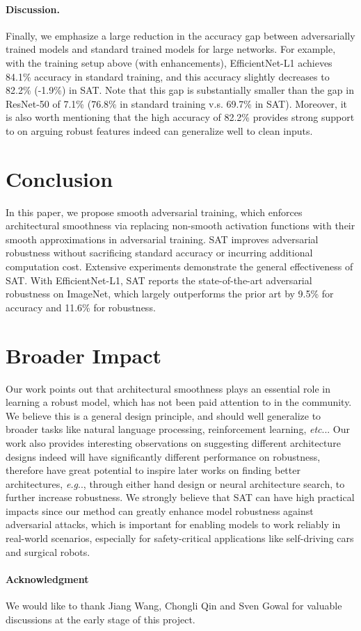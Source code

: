 \documentclass{article}
\makeatletter
\DeclareRobustCommand\onedot{\futurelet\@let@token\@onedot}
\def\@onedot{\ifx\@let@token.\else.\null\fi\xspace}
\def\eg{\emph{e.g}\onedot} \def\Eg{\emph{E.g}\onedot}
\def\etc{\emph{etc}\onedot} \def\vs{\emph{vs}\onedot}
\makeatother
\begin{document}
\paragraph{Discussion.}
Finally, we emphasize a large reduction in the accuracy gap between adversarially trained models and standard trained models for large networks. For example, with the training setup above (with enhancements), EfficientNet-L1 achieves 84.1\% accuracy in standard training, and this accuracy slightly decreases to 82.2\% (-1.9\%) in SAT. Note that this gap is substantially smaller than the gap in ResNet-50 of 7.1\% (76.8\% in standard training v.s. 69.7\% in SAT). Moreover, it is also worth mentioning that the high accuracy of 82.2\% provides strong support to \cite{Ilyas2019} on arguing robust features indeed can generalize well to clean inputs.


\section{Conclusion}
In this paper, we propose smooth adversarial training, which enforces architectural smoothness via replacing non-smooth activation functions with their smooth approximations in adversarial training. SAT improves adversarial robustness without sacrificing standard accuracy or incurring additional computation cost. 
Extensive experiments demonstrate the general effectiveness of SAT. 
With EfficientNet-L1, SAT reports the state-of-the-art adversarial robustness on ImageNet, which largely outperforms the prior art \cite{Qin2019} by 9.5\% for accuracy and 11.6\% for robustness.


\section*{Broader Impact}
Our work points out that architectural smoothness plays an essential role in learning a robust model, which has not been paid attention to in the community.
We believe this is a general design principle, and should well generalize to broader tasks like natural language processing, reinforcement learning, \etc. Our work also provides interesting observations on suggesting different architecture designs indeed will have significantly different performance on robustness, therefore have great potential to inspire later works on finding better architectures, \eg, through either hand design or neural architecture search, to further increase robustness. 
We strongly believe that SAT can have high practical impacts since our method can greatly enhance model robustness against adversarial attacks, which is important for enabling models to work reliably in real-world scenarios, especially for safety-critical applications like self-driving cars and surgical robots. 


\paragraph{Acknowledgment} 
We would like to thank Jiang Wang, Chongli Qin and Sven Gowal for valuable discussions at the early stage of this project. 



{\small
	
}
\end{document}
